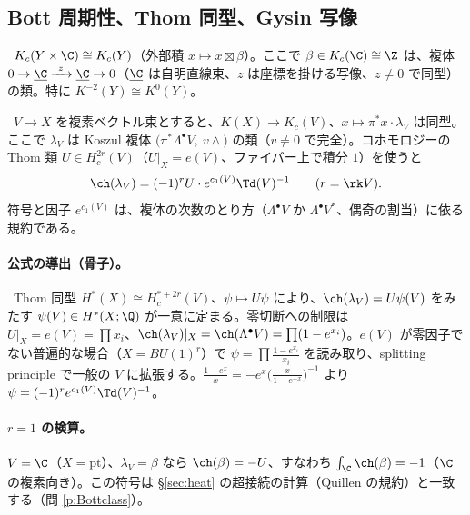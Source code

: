 \subsection{Bott 周期性、Thom 同型、Gysin 写像}\label{sec:Bott}
\begin{thm}\label{thm:Bott}\tC\
$K_c(Y\times\C)\cong K_c(Y)$（外部積 $x\mapsto x\boxtimes\beta$）。ここで $\beta\in K_c(\C)\cong\Z$ は、複体 $0\to\underline\C\xrightarrow{\ z\ }\underline\C\to0$（$\underline\C$ は自明直線束、$z$ は座標を掛ける写像、$z\ne0$ で同型）の類。特に $K^{-2}(Y)\cong K^0(Y)$。
\end{thm}
\begin{thm}[Thom 同型]\label{thm:Thom}\tC\
$V\to X$ を複素ベクトル束とすると、$K(X)\to K_c(V)$、$x\mapsto\pi^*x\cdot\lambda_V$ は同型。ここで $\lambda_V$ は Koszul 複体 $\bigl(\pi^*\Lambda^{\bullet}V,\ v\wedge\bigr)$ の類（$v\ne0$ で完全）。コホモロジーの Thom 類 $U\in H^{2r}_c(V)$（$U|_{X}=e(V)$、ファイバー上で積分 $1$）を使うと
\[
\ch(\lambda_V)=(-1)^rU\cdot e^{c_1(V)}\Td(V)^{-1}\qquad(r=\rk V).
\]
符号と因子 $e^{c_1(V)}$ は、複体の次数のとり方（$\Lambda^\bullet V$ か $\Lambda^\bullet V^*$、偶奇の割当）に依る規約である。
\end{thm}
\paragraph{公式の導出（骨子）。}\tP\ Thom 同型 $H^*(X)\cong H_c^{*+2r}(V)$、$\psi\mapsto U\psi$ により、$\ch(\lambda_V)=U\psi(V)$ をみたす $\psi(V)\in H^*(X;\Q)$ が一意に定まる。零切断への制限は $U|_X=e(V)=\prod x_i$、$\ch(\lambda_V)|_X=\ch(\Lambda^\bullet V)=\prod(1-e^{x_i})$。$e(V)$ が零因子でない普遍的な場合（$X=BU(1)^r$）で $\psi=\prod\frac{1-e^{x_i}}{x_i}$ を読み取り、splitting principle で一般の $V$ に拡張する。$\frac{1-e^x}x=-e^x\bigl(\frac{x}{1-e^{-x}}\bigr)^{-1}$ より $\psi=(-1)^re^{c_1(V)}\Td(V)^{-1}$。

\paragraph{$r=1$ の検算。}$V=\C$（$X=\mathrm{pt}$）、$\lambda_V=\beta$ なら $\ch(\beta)=-U$、すなわち $\int_{\C}\ch(\beta)=-1$（$\C$ の複素向き）。この符号は \S\ref{sec:heat} の超接続の計算（Quillen の規約）と一致する（問 \ref{p:Bottclass}）。

